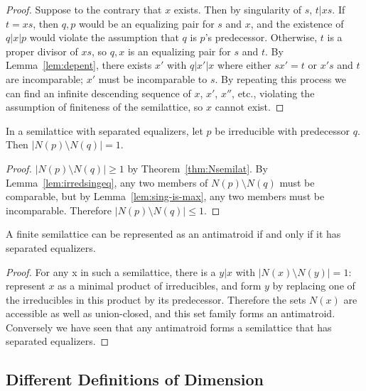 \documentclass[11pt]{llncs}
\begin{document}
{\begin{proof}
Suppose to the contrary that $x$ exists.
Then by singularity of $s$, $t|xs$. If $t=xs$, then $q,p$ would be an equalizing pair for $s$ and $x$, and the existence of $q|x|p$ would violate the assumption that $q$ is $p$'s predecessor.
Otherwise, $t$ is a proper divisor of $xs$, so $q,x$ is an equalizing pair for $s$ and $t$.
By Lemma~\ref{lem:depent}, there exists $x'$ with $q|x'|x$ where either $sx'=t$ or $x's$  and $t$ are incomparable;  $x'$ must be incomparable to $s$.
By repeating this process we can find an infinite descending sequence of $x$, $x'$, $x''$, etc., violating the assumption of finiteness of the semilattice, so $x$ cannot exist.
\end{proof}

\begin{lemma}
\label{lem:irred-single}
In a semilattice with separated equalizers, let $p$ be irreducible with predecessor $q$.
Then $|N(p)\setminus N(q)|=1$.
\end{lemma}

\begin{proof}
$|N(p)\setminus N(q)|\ge 1$ by Theorem~\ref{thm:Nsemilat}.
By Lemma~\ref{lem:irredsingeq}, any two members of $N(p)\setminus N(q)$ must be comparable, but by Lemma~\ref{lem:sing-is-max}, any two members must be incomparable.
Therefore $|N(p)\setminus N(q)|\le 1$.
\end{proof}
 
\begin{theorem}
A finite semilattice can be represented as an antimatroid if and only if it has separated equalizers.
\end{theorem}

\begin{proof}
For any x in such a semilattice, there is a $y|x$ with $|N(x)\setminus N(y)|=1$: represent $x$ as a minimal product of irreducibles, and form $y$ by replacing one of the irreducibles in this product by its predecessor. Therefore the sets $N(x)$ are accessible as well as union-closed, and this set family forms an antimatroid. Conversely we have seen that any antimatroid forms a semilattice that has separated equalizers.
\end{proof}

\subsection{Different Definitions of Dimension}

}
\end{document}
